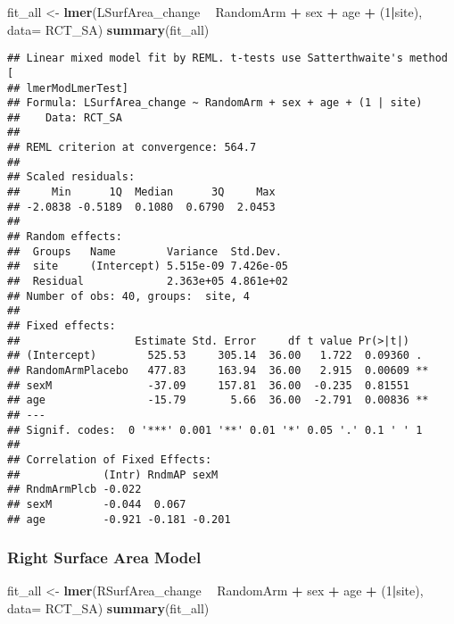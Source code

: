 \documentclass[]{article}
\newenvironment{Shaded}{\begin{snugshade}}{\end{snugshade}}
\newcommand{\KeywordTok}[1]{\textcolor[rgb]{0.13,0.29,0.53}{\textbf{#1}}}
\newcommand{\DataTypeTok}[1]{\textcolor[rgb]{0.13,0.29,0.53}{#1}}
\newcommand{\DecValTok}[1]{\textcolor[rgb]{0.00,0.00,0.81}{#1}}
\newcommand{\StringTok}[1]{\textcolor[rgb]{0.31,0.60,0.02}{#1}}
\newcommand{\OperatorTok}[1]{\textcolor[rgb]{0.81,0.36,0.00}{\textbf{#1}}}
\newcommand{\NormalTok}[1]{#1}
\theoremstyle{definition}
\theoremstyle{definition}
\theoremstyle{definition}
\theoremstyle{remark}
\begin{document}
\begin{Shaded}
\begin{Highlighting}[]
\NormalTok{fit_all <-}\StringTok{ }\KeywordTok{lmer}\NormalTok{(LSurfArea_change }\OperatorTok{~}\StringTok{ }\NormalTok{RandomArm }\OperatorTok{+}\StringTok{ }\NormalTok{sex }\OperatorTok{+}\StringTok{ }\NormalTok{age }\OperatorTok{+}\StringTok{ }\NormalTok{(}\DecValTok{1}\OperatorTok{|}\NormalTok{site), }\DataTypeTok{data=}\NormalTok{ RCT_SA)}
\KeywordTok{summary}\NormalTok{(fit_all)}
\end{Highlighting}
\end{Shaded}

\begin{verbatim}
## Linear mixed model fit by REML. t-tests use Satterthwaite's method [
## lmerModLmerTest]
## Formula: LSurfArea_change ~ RandomArm + sex + age + (1 | site)
##    Data: RCT_SA
## 
## REML criterion at convergence: 564.7
## 
## Scaled residuals: 
##     Min      1Q  Median      3Q     Max 
## -2.0838 -0.5189  0.1080  0.6790  2.0453 
## 
## Random effects:
##  Groups   Name        Variance  Std.Dev. 
##  site     (Intercept) 5.515e-09 7.426e-05
##  Residual             2.363e+05 4.861e+02
## Number of obs: 40, groups:  site, 4
## 
## Fixed effects:
##                  Estimate Std. Error     df t value Pr(>|t|)   
## (Intercept)        525.53     305.14  36.00   1.722  0.09360 . 
## RandomArmPlacebo   477.83     163.94  36.00   2.915  0.00609 **
## sexM               -37.09     157.81  36.00  -0.235  0.81551   
## age                -15.79       5.66  36.00  -2.791  0.00836 **
## ---
## Signif. codes:  0 '***' 0.001 '**' 0.01 '*' 0.05 '.' 0.1 ' ' 1
## 
## Correlation of Fixed Effects:
##             (Intr) RndmAP sexM  
## RndmArmPlcb -0.022              
## sexM        -0.044  0.067       
## age         -0.921 -0.181 -0.201
\end{verbatim}

\subsubsection{Right Surface Area Model}\label{right-surface-area-model}

\begin{Shaded}
\begin{Highlighting}[]
\NormalTok{fit_all <-}\StringTok{ }\KeywordTok{lmer}\NormalTok{(RSurfArea_change }\OperatorTok{~}\StringTok{ }\NormalTok{RandomArm }\OperatorTok{+}\StringTok{ }\NormalTok{sex }\OperatorTok{+}\StringTok{ }\NormalTok{age }\OperatorTok{+}\StringTok{ }\NormalTok{(}\DecValTok{1}\OperatorTok{|}\NormalTok{site), }\DataTypeTok{data=}\NormalTok{ RCT_SA)}
\KeywordTok{summary}\NormalTok{(fit_all)}
\end{Highlighting}
\end{Shaded}
\end{document}
